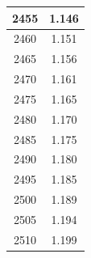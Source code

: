 \documentclass[a4paper]{article}
\begin{document}
\begin{tabular}{|c|c|}
		\hline
		2455 & 1.146 \\
		\hline
		2460 & 1.151 \\
		\hline
		2465 & 1.156 \\
		\hline
		2470 & 1.161 \\
		\hline
		2475 & 1.165 \\
		\hline
		2480 & 1.170 \\
		\hline
		2485 & 1.175 \\
		\hline
		2490 & 1.180 \\
		\hline
		2495 & 1.185 \\
		\hline
		2500 & 1.189 \\
		\hline
		2505 & 1.194 \\
		\hline
		2510 & 1.199 \\
		\hline
	\end{tabular}
	\hfill
\end{document}
